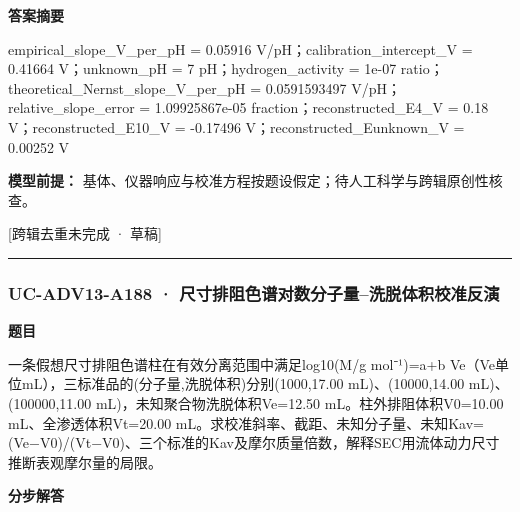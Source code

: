\documentclass[UTF8,11pt,a4paper]{ctexart}
\begin{document}
\noindent\textbf{答案摘要}\par
empirical\_slope\_V\_per\_pH = 0.05916 V/pH；calibration\_intercept\_V = 0.41664 V；unknown\_pH = 7 pH；hydrogen\_activity = 1e-07 ratio；theoretical\_Nernst\_slope\_V\_per\_pH = 0.0591593497 V/pH；relative\_slope\_error = 1.09925867e-05 fraction；reconstructed\_E4\_V = 0.18 V；reconstructed\_E10\_V = -0.17496 V；reconstructed\_Eunknown\_V = 0.00252 V\par
\noindent\textbf{模型前提：}
基体、仪器响应与校准方程按题设假定；待人工科学与跨辑原创性核查。\par
\noindent\textcolor{red!65!black}{[跨辑去重未完成 · 草稿]} \par
\medskip\hrule\medskip
{}
\subsubsection*{UC-ADV13-A188 · 尺寸排阻色谱对数分子量–洗脱体积校准反演}
\noindent\textbf{题目}\par
一条假想尺寸排阻色谱柱在有效分离范围中满足log10(M/g mol⁻¹)=a+b Ve（Ve单位mL），三标准品的(分子量,洗脱体积)分别(1000,17.00 mL)、(10000,14.00 mL)、(100000,11.00 mL)，未知聚合物洗脱体积Ve=12.50 mL。柱外排阻体积V0=10.00 mL、全渗透体积Vt=20.00 mL。求校准斜率、截距、未知分子量、未知Kav=(Ve−V0)/(Vt−V0)、三个标准的Kav及摩尔质量倍数，解释SEC用流体动力尺寸推断表观摩尔量的局限。\par
\medskip\noindent\textbf{分步解答}
\end{document}
